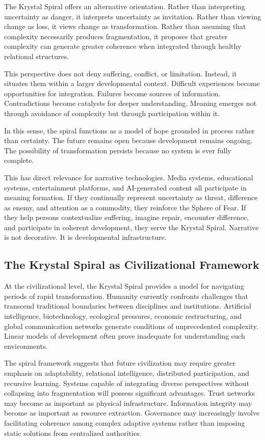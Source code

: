 \documentclass[12pt]{article}
\begin{document}
The Krystal Spiral offers an alternative orientation. Rather than interpreting uncertainty as danger, it interprets uncertainty as invitation. Rather than viewing change as loss, it views change as transformation. Rather than assuming that complexity necessarily produces fragmentation, it proposes that greater complexity can generate greater coherence when integrated through healthy relational structures.

This perspective does not deny suffering, conflict, or limitation. Instead, it situates them within a larger developmental context. Difficult experiences become opportunities for integration. Failures become sources of information. Contradictions become catalysts for deeper understanding. Meaning emerges not through avoidance of complexity but through participation within it.

In this sense, the spiral functions as a model of hope grounded in process rather than certainty. The future remains open because development remains ongoing. The possibility of transformation persists because no system is ever fully complete.

This has direct relevance for narrative technologies. Media systems, educational systems, entertainment platforms, and AI-generated content all participate in meaning formation. If they continually represent uncertainty as threat, difference as enemy, and attention as a commodity, they reinforce the Sphere of Fear. If they help persons contextualize suffering, imagine repair, encounter difference, and participate in coherent development, they serve the Krystal Spiral. Narrative is not decorative. It is developmental infrastructure.

\subsection{The Krystal Spiral as Civilizational Framework}

At the civilizational level, the Krystal Spiral provides a model for navigating periods of rapid transformation. Humanity currently confronts challenges that transcend traditional boundaries between disciplines and institutions. Artificial intelligence, biotechnology, ecological pressures, economic restructuring, and global communication networks generate conditions of unprecedented complexity. Linear models of development often prove inadequate for understanding such environments.

The spiral framework suggests that future civilization may require greater emphasis on adaptability, relational intelligence, distributed participation, and recursive learning. Systems capable of integrating diverse perspectives without collapsing into fragmentation will possess significant advantages. Trust networks may become as important as physical infrastructure. Information integrity may become as important as resource extraction. Governance may increasingly involve facilitating coherence among complex adaptive systems rather than imposing static solutions from centralized authorities.
\end{document}
